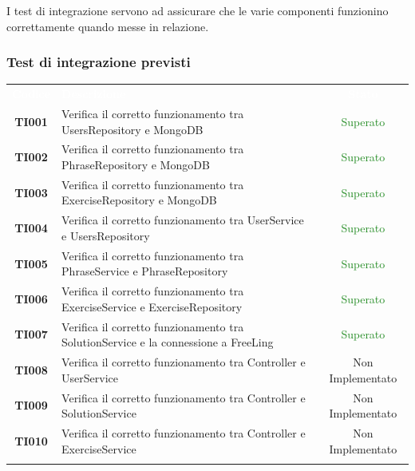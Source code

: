 I test di integrazione servono ad assicurare che le varie componenti funzionino correttamente quando messe in relazione.


\subsubsection{Test di integrazione previsti}

\begin{tabularx}{\textwidth}{cXc}
	
	\rowcolor{greySWEight}
	
	\rowcolor{greySWEight}
	\textcolor{white}{\textbf{Codice}} & 
	\textcolor{white}{\textbf{Descrizione}} &
	\textcolor{white}{\textbf{Stato}} \\

\textbf{TI001} & Verifica il corretto funzionamento tra UsersRepository e MongoDB & \textcolor{ForestGreen}{Superato} \\
\textbf{TI002} & Verifica il corretto funzionamento tra PhraseRepository e MongoDB & \textcolor{ForestGreen}{Superato} \\
\textbf{TI003} & Verifica il corretto funzionamento tra ExerciseRepository e MongoDB & \textcolor{ForestGreen}{Superato} \\
\textbf{TI004} & Verifica il corretto funzionamento tra UserService e UsersRepository & \textcolor{ForestGreen}{Superato} \\
\textbf{TI005} & Verifica il corretto funzionamento tra PhraseService e PhraseRepository & \textcolor{ForestGreen}{Superato} \\
\textbf{TI006} & Verifica il corretto funzionamento tra ExerciseService e ExerciseRepository & \textcolor{ForestGreen}{Superato} \\
\textbf{TI007} & Verifica il corretto funzionamento tra SolutionService e la connessione a FreeLing & \textcolor{ForestGreen}{Superato} \\
\textbf{TI008} & Verifica il corretto funzionamento tra Controller e UserService & Non Implementato \\
\textbf{TI009} & Verifica il corretto funzionamento tra Controller e SolutionService & Non Implementato \\
\textbf{TI010} & Verifica il corretto funzionamento tra Controller e ExerciseService & Non Implementato \\
	
	\rowcolor{white}
	\caption{Test di integrazione}
	\label{tab:tabellatestintegrazione}
\end{tabularx}

